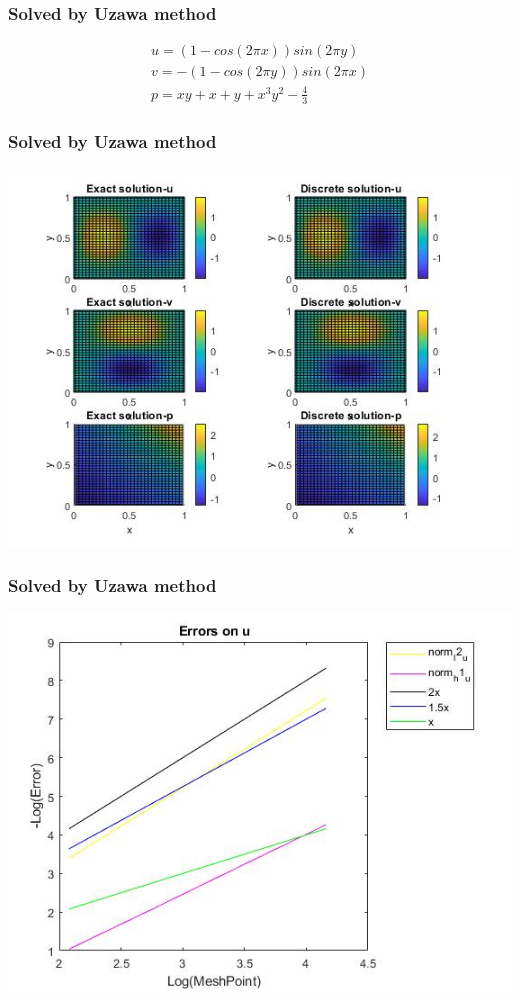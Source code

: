 \documentclass[11pt]{beamer}
\numberwithin{equation}{section}
\theoremstyle{plain}
\theoremstyle{definition}
\theoremstyle{remark}
\begin{document}
\begin{frame}\frametitle{Solved by Uzawa method}

\begin{align*}
u=(1-cos(2\pi x))sin(2 \pi y) \\
v=-(1-cos(2\pi y))sin(2 \pi x) \\
p=xy+x+y+x^3y^2-\frac{4}{3}
\end{align*}
\end{frame}
\begin{frame}\frametitle{Solved by Uzawa method}
\begin{center}
\includegraphics[scale=0.45]{10}
\end{center}
\end{frame}
\begin{frame}\frametitle{Solved by Uzawa method}
\includegraphics[scale=0.5]{11}
\end{frame}
\end{document}
